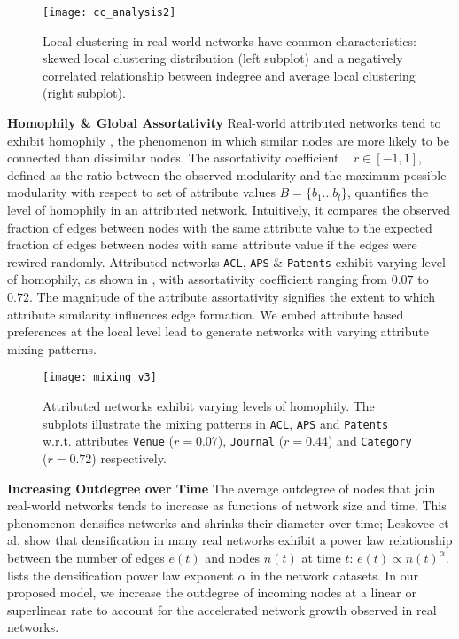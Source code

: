 \begin{figure}
 \centering
 \texttt{[image: cc\_analysis2]}
 \caption{
    Local clustering in real-world networks have common characteristics:
    skewed local clustering distribution (left subplot) and a negatively correlated
    relationship between indegree and average local clustering (right subplot).
 }
 \label{fig:cc_dc}
\end{figure}


\textbf{Homophily \& Global Assortativity}
Real-world attributed networks tend to exhibit homophily
\cite{mcpherson2001birds}, the phenomenon in which similar nodes are more likely
to be connected than dissimilar nodes. The assortativity coefficient
~\cite{newman2002assortative} $r \in [-1, 1]$, defined as the ratio between the observed modularity and
the maximum possible modularity with respect to set of attribute values $B=\{b_1...b_l\}$,
quantifies the level of homophily in an attributed network. Intuitively, it
compares the observed fraction of edges between nodes with the same attribute
value to the expected fraction of edges between nodes with same attribute value
if the edges were rewired randomly.
Attributed networks \texttt{ACL}, \texttt{APS} \& \texttt{Patents} exhibit
varying level of homophily, as shown in , with assortativity
coefficient ranging from $0.07$ to $0.72$.
The magnitude of the attribute assortativity
signifies the extent to which attribute similarity influences edge formation.
We embed attribute based preferences at the local level lead to generate networks
with varying attribute mixing patterns. 

\begin{figure}
 \centering
 \texttt{[image: mixing\_v3]}
 \caption{
    Attributed networks exhibit varying levels of homophily. The subplots
    illustrate the mixing patterns in \texttt{ACL}, \texttt{APS} and \texttt{Patents}
    w.r.t. attributes \texttt{Venue} ($r=0.07$), \texttt{Journal} ($r=0.44$) and
    \texttt{Category} ($r=0.72$) respectively.
 }
 \label{fig:mixing}
\end{figure}

\textbf{Increasing Outdegree over Time}
The average outdegree of nodes that join real-world networks tends to increase
as functions of network size and time. This phenomenon densifies networks and shrinks their
diameter over time; Leskovec et al. \cite{leskovec2005graphs} show that
densification in many real networks exhibit a power law relationship between the
number of edges $e(t)$ and nodes $n(t)$ at time $t$: $e(t) \propto
n(t)^{\alpha}$.  lists the densification power law exponent $\alpha$ in
the network datasets. In our proposed model, we increase the outdegree of incoming nodes
at a linear or superlinear rate to account for the accelerated network growth
observed in real networks.

